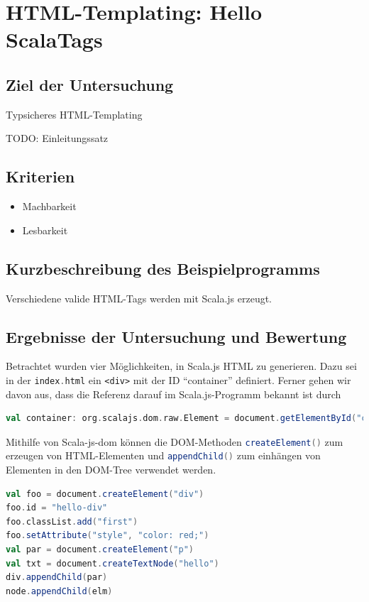 \documentclass[a4paper, 12pt, hidelinks, listof=totoc, listoftables=totoc, bibliography=totoc]{scrreprt}
\newcommand{\code}[1]{\lstinline[language=Scala, style=inline]|#1|}
\newcommand{\scala}[1]{\lstinline[language=Scala, style=inline]|#1|}
\newcommand{\html}[1]{\lstinline[language=HTML5, style=inline]|#1|}
\begin{document}
\section{HTML-Templating: Hello ScalaTags}

\subsection{Ziel der Untersuchung}

Typsicheres HTML-Templating 

TODO: Einleitungssatz

\subsection{Kriterien}

\begin{itemize}
	\item Machbarkeit
	\item Lesbarkeit
\end{itemize}

\subsection{Kurzbeschreibung des Beispielprogramms}

Verschiedene valide HTML-Tags werden mit Scala.js erzeugt.

\subsection{Ergebnisse der Untersuchung und Bewertung}

Betrachtet wurden vier Möglichkeiten, in Scala.js HTML zu generieren. Dazu sei in der \code{index.html} ein
\html{<div>} mit der ID "`container"' definiert. Ferner gehen wir davon aus, dass die Referenz darauf im Scala.js-Programm bekannt ist durch

\begin{lstlisting}[language=Scala, style=snippet]
val container: org.scalajs.dom.raw.Element = document.getElementById("container")
\end{lstlisting}

Mithilfe von Scala-js-dom können die DOM-Methoden \scala{createElement()} zum erzeugen von HTML-Elementen und \scala{appendChild()} zum einhängen von Elementen in den DOM-Tree verwendet werden.

\begin{lstlisting}[language=Scala, caption={HTML-Generierung mit Scala-js-dom und Nodes.}]
val foo = document.createElement("div")
foo.id = "hello-div"
foo.classList.add("first")
foo.setAttribute("style", "color: red;")
val par = document.createElement("p")
val txt = document.createTextNode("hello")
div.appendChild(par)
node.appendChild(elm)
\end{lstlisting}
\end{document}
